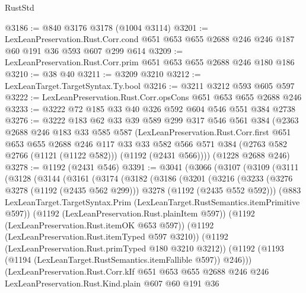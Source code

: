 \begin{lexlean}{RustStd}
\begin{coremodule}
@3186 := @840 @3176 @3178 (@1004 @3114)
@3201 := LexLeanPreservation.Rust.Corr.cond
    @651
    @653
    @655
    @2688
    @246
    @246
    @187
    @60
    @191
    @36
    @593
    @607
    @299
    @614
@3209 := LexLeanPreservation.Rust.Corr.prim @651 @653 @655 @2688 @246 @180 @186
@3210 := @38 @40
@3211 := @3209 @3210
@3212 := LexLeanTarget.TargetSyntax.Ty.bool
@3216 := @3211 @3212 @593 @605 @597
@3222 := LexLeanPreservation.Rust.Corr.opsCons @651 @653 @655 @2688 @246
@3233 := @3222 @72 @185 @33 @40 @326 @592 @604 @546 @551 @384 @2738
@3276 := @3222
    @183
    @62
    @33
    @39
    @589
    @299
    @317
    @546
    @561
    @384
    (@2363
      @2688
      @246
      @183
      @33
      @585
      @587
      (LexLeanPreservation.Rust.Corr.first
        @651
        @653
        @655
        @2688
        @246
        @117
        @33
        @33
        @582
        @566
        @571
        @384
        (@2763 @582 @2766 (@1121 (@1122 @582)))
        (@1192 (@2431 @566))))
    (@1228 @2688 @246)
@3278 := @1192 (@2431 @546)
@3391 := @3041
    (@3066
      (@3107
        (@3109
          (@3111
            (@3128
              (@3144
                (@3161
                  (@3174
                    (@3182
                      (@3186
                        (@3201
                          (@3216
                            (@3233
                              (@3276 @3278 (@1192 (@2435 @562 @299)))
                              @3278
                              (@1192 (@2435 @552 @592)))
                            (@883
                              LexLeanTarget.TargetSyntax.Prim
                              (LexLeanTarget.RustSemantics.itemPrimitive @597))
                            (@1192 (LexLeanPreservation.Rust.plainItem @597))
                            (@1192 (LexLeanPreservation.Rust.itemOK @653 @597))
                            (@1192 (LexLeanPreservation.Rust.itemTyped @597 @3210))
                            (@1192 (LexLeanPreservation.Rust.primTyped @180 @3210 @3212))
                            (@1192
                              (@1193 (@1194 (LexLeanTarget.RustSemantics.itemFallible @597)) @246)))
                          (LexLeanPreservation.Rust.Corr.kIf
                            @651
                            @653
                            @655
                            @2688
                            @246
                            @246
                            LexLeanPreservation.Rust.Kind.plain
                            @607
                            @60
                            @191
                            @36

\end{coremodule}
\end{lexlean}
